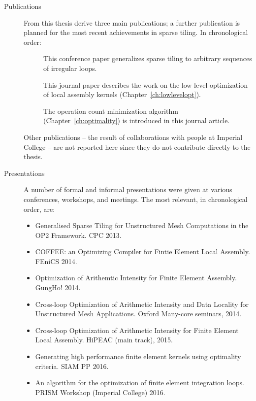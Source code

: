 \begin{description}
\item[Publications] From this thesis derive three main publications; a further publication is planned for the most recent achievements in sparse tiling. In chronological order:
\begin{description}
\item[\citep{st-paper}] This conference paper generalizes sparse tiling to arbitrary sequences of irregular loops.
\item[\citep{Luporini-coffee}] This journal paper describes the work on the low level optimization of local assembly kernels (Chapter~\ref{ch:lowlevelopt}).
\item[\citep{Luporini-minimalflops}] The operation count minimization algorithm (Chapter~\ref{ch:optimality}) is introduced in this journal article.
\end{description}
Other publications -- the result of collaborations with people at Imperial College -- are not reported here since they do not contribute directly to the thesis.
\item[Presentations] A number of formal and informal presentations were given at various conferences, workshops, and meetings. The most relevant, in chronological order, are:
\begin{itemize}
\item Generalised Sparse Tiling for Unstructured Mesh Computations in the OP2 Framework. CPC 2013.
\item COFFEE: an Optimizing Compiler for Fintie Element Local Assembly. FEniCS 2014.
\item Optimization of Arithemtic Intensity for Finite Element Assembly. GungHo! 2014.
\item Cross-loop Optimization of Arithmetic Intensity and Data Locality for Unstructured Mesh Applications. Oxford Many-core seminars, 2014.
\item Cross-loop Optimization of Arithmetic Intensity for Finite Element Local Assembly. HiPEAC (main track), 2015.
\item Generating high performance finite element kernels using optimality criteria. SIAM PP 2016.
\item An algorithm for the optimization of finite element integration loops. PRISM Workshop (Imperial College) 2016.
\end{itemize}
\end{description}


